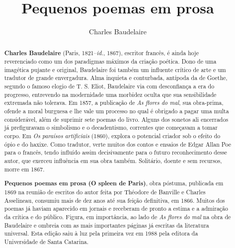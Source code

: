 \documentclass[12pt]{extarticle}
\begin{document}
\newcommand{\AutorLivro}{Charles Baudelaire}
\newcommand{\TituloLivro}{Pequenos poemas em prosa}
\newcommand{\Tema}{Ficção, mistério e fantasia}
\newcommand{\Genero}{Poema}
\newcommand{\imagemCapa}{./images/PNLD0010-01.png}
\newcommand{\issnppub}{---}
\newcommand{\issnepub}{---}
\newcommand{\colaborador}{\textbf{Bruno Gradella e Vicente Castro} é uma pessoa incrível e vai fazer um bom serviço.}


\title{\TituloLivro}
\author{\AutorLivro}
\def\authornotes{\colaborador}

\date{}
\maketitle


\begin{abstract}

\textbf{Charles Baudelaire} (Paris, 1821--\textit{id.}, 1867), escritor francês, é
 ainda hoje reverenciado como um dos paradigmas máximos da criação poética.
 Dono de uma imagética pujante e original, Baudelaire foi também um
 influente crítico de arte e um tradutor de grande envergadura. Alma
 inquieta e conturbada, antípoda da de Goethe, segundo o famoso elogio de
 T. S. Eliot, Baudelaire via com desconfiança a era do progresso,
 entrevendo na modernidade uma morbidez oculta que sua sensibilidade
 extremada não tolerava. Em 1857, a publicação de \textit{As flores do mal}, sua
 obra-prima, ofende a moral burguesa e lhe vale um processo no qual é
 obrigado a pagar uma multa considerável, além de suprimir sete poemas do livro.
 Alguns dos sonetos ali encerrados
 já prefiguravam o simbolismo e o decadentismo, correntes que começavam a
 tomar corpo. Em \textit{Os paraísos artificiais} (1860), explora o potencial
 criador sob o efeito do ópio e do haxixe. Como tradutor, verte
 muitos dos contos e ensaios de  Edgar Allan Poe para o francês, tendo influído assim decisivamente
 para o futuro reconhecimento desse autor, que 
 exerceu influência em sua obra também. Solitário, doente e sem recursos,
 morre em 1867.

\textbf{Pequenos poemas em prosa (O spleen de Paris)}, obra póstuma, publicada em 1869 na reunião
 de escritos do autor feita por Théodore de Banville e Charles Asselineau,
 consumiu mais de dez anos até sua feição definitiva, em 1866. Muitos dos poemas
 já haviam aparecido em jornais e receberam de pronto a estima e a
 admiração da crítica e do público. Figura, em importância, ao lado de
 \textit{As flores do mal} na obra de Baudelaire e ombreia com
 as mais importantes páginas já escritas da literatura universal. Esta edição
saiu à luz pela primeira vez em 1988 pela editora da Universidade de Santa Catarina.

\end{abstract}
\end{document}
